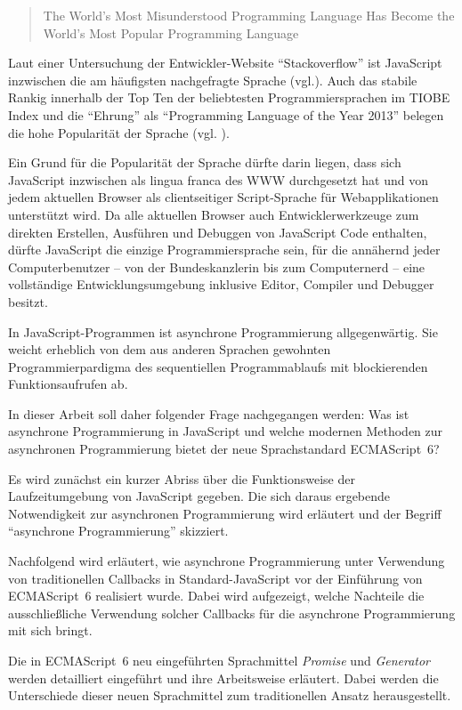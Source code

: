 \documentclass[
11pt, %
a4paper, %
oneside, %
pdfspacing, %
headinclude,
BCOR5mm, %
ngerman, %
bibtotocnumbered,
]{scrartcl}
\begin{document}
\begin{quote}
	The World's Most Misunderstood Programming Language Has Become the World's Most Popular Programming Language~\citep{Crockford.2008a}
\end{quote}

Laut einer Untersuchung der Entwickler-Website "`Stackoverflow"' ist JavaScript inzwischen die am häufigsten nachgefragte Sprache (vgl.\citep{Taft.2016}). Auch das stabile Rankig innerhalb der Top Ten der beliebtesten Programmiersprachen im TIOBE Index und die "`Ehrung"' als "`Programming Language of the Year 2013"' belegen die hohe Popularität der Sprache (vgl. \citep{Tiobe}).

Ein Grund für die Popularität der Sprache dürfte darin liegen, dass sich JavaScript inzwischen als lingua franca des WWW durchgesetzt hat und von jedem aktuellen Browser als clientseitiger Script-Sprache für Webapplikationen unterstützt wird. Da alle aktuellen Browser auch Entwicklerwerkzeuge zum direkten Erstellen, Ausführen und Debuggen von JavaScript Code enthalten, dürfte JavaScript die einzige Programmiersprache sein, für die annähernd jeder Computerbenutzer -- von der Bundeskanzlerin bis zum Computernerd -- eine vollständige Entwicklungsumgebung inklusive Editor, Compiler und Debugger besitzt.

\skippingparagraph    
In JavaScript-Programmen ist asynchrone Programmierung allgegenwärtig. Sie weicht erheblich von dem aus anderen Sprachen gewohnten Programmierpardigma des sequentiellen Programmablaufs mit blockierenden Funktionsaufrufen ab. 

In dieser Arbeit soll daher folgender Frage nachgegangen werden:
Was ist asynchrone Programmierung in JavaScript und welche modernen Methoden zur asynchronen Programmierung bietet der neue Sprachstandard ECMAScript~6?

Es wird zunächst ein kurzer Abriss über die Funktionsweise der Laufzeitumgebung von JavaScript gegeben. Die sich daraus ergebende Notwendigkeit zur asynchronen Programmierung wird erläutert und der Begriff "`asynchrone Programmierung"' skizziert.

Nachfolgend wird erläutert, wie asynchrone Programmierung unter Verwendung von traditionellen Callbacks in Standard-JavaScript vor der Einführung von ECMAScript~6 realisiert wurde. Dabei wird aufgezeigt, welche Nachteile die ausschließliche Verwendung solcher Callbacks für die asynchrone Programmierung mit sich bringt.

Die in ECMAScript~6 neu eingeführten Sprachmittel \emph{Promise} und \emph{Generator} werden detailliert eingeführt und ihre Arbeitsweise erläutert. Dabei werden die Unterschiede dieser neuen Sprachmittel zum traditionellen Ansatz herausgestellt.
\end{document}
